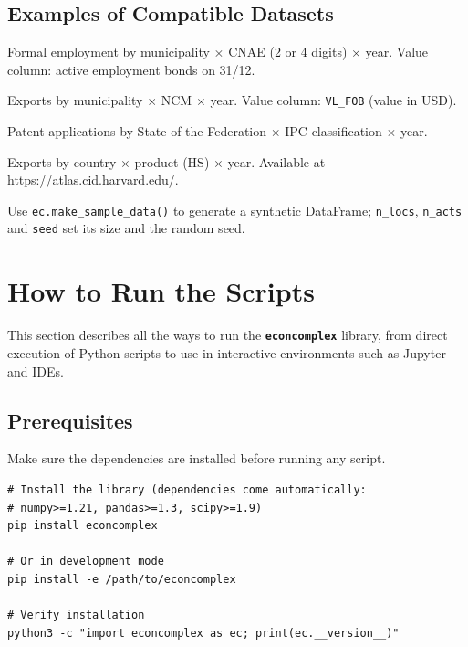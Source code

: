 \documentclass[12pt, a4paper]{article}
\newcommand{\pkg}[1]{\texttt{\textbf{#1}}}
\newcommand{\fn}[1]{\texttt{#1}}
\begin{document}
\subsection{Examples of Compatible Datasets}

\begin{description}[leftmargin=1.5em, style=nextline]
  \item[\textbf{RAIS/MTE}]
    Formal employment by municipality $\times$ CNAE (2 or 4 digits)
    $\times$ year. Value column: active employment bonds on 31/12.
  \item[\textbf{COMEX/MDIC}]
    Exports by municipality $\times$ NCM $\times$ year.
    Value column: \texttt{VL\_FOB} (value in USD).
  \item[\textbf{INPI --- Patents}]
    Patent applications by State of the Federation $\times$
    IPC classification $\times$ year.
  \item[\textbf{Atlas of Economic Complexity (Harvard)}]
    Exports by country $\times$ product (HS) $\times$ year.
    Available at \url{https://atlas.cid.harvard.edu/}.
  \item[\textbf{Simulated data (testing)}]
    {\sloppy Use \fn{ec.make\_sample\_data()} to generate a synthetic
    DataFrame; \fn{n\_locs}, \fn{n\_acts} and \fn{seed} set its size and
    the random seed.\par}
\end{description}

\section{How to Run the Scripts}

This section describes all the ways to run the \pkg{econcomplex}
library, from direct execution of Python scripts to use in interactive
environments such as Jupyter and IDEs.

\subsection{Prerequisites}

\begin{warnbox}
  Make sure the dependencies are installed before running any script.
\end{warnbox}

\begin{lstlisting}[style=bashstyle,
  caption={Installing the dependencies}]
# Install the library (dependencies come automatically:
# numpy>=1.21, pandas>=1.3, scipy>=1.9)
pip install econcomplex

# Or in development mode
pip install -e /path/to/econcomplex

# Verify installation
python3 -c "import econcomplex as ec; print(ec.__version__)"
\end{lstlisting}
\end{document}
